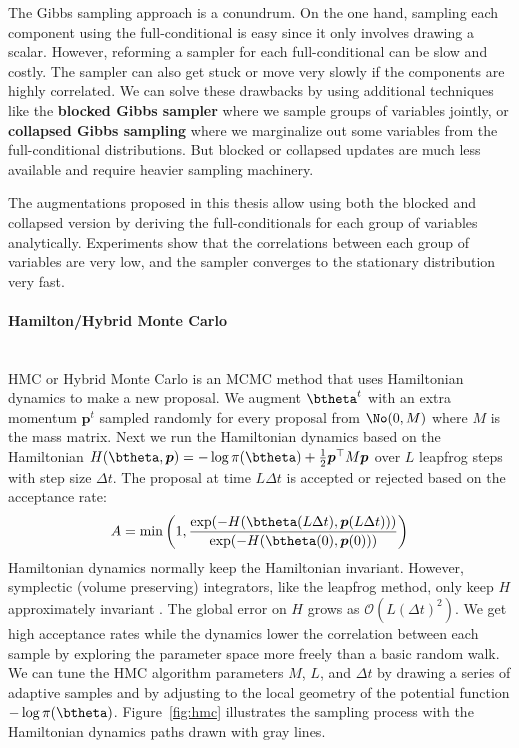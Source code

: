 The Gibbs sampling approach is a conundrum.
On the one hand, sampling each component using the full-conditional is easy since it only involves drawing a scalar.
However, reforming a sampler for each full-conditional can be slow and costly.
The sampler can also get stuck or move very slowly if the components are highly correlated.
We can solve these drawbacks by using additional techniques like the \textbf{blocked Gibbs sampler} \cite{jensen1995blocking} where we sample groups of variables jointly, or \textbf{collapsed Gibbs sampling} \cite{liu1994collapsed} where we marginalize out some variables from the full-conditional distributions.
But blocked or collapsed updates are much less available and require heavier sampling machinery.

The augmentations proposed in this thesis allow using both the blocked and collapsed version by deriving the full-conditionals for each group of variables analytically.
Experiments show that the correlations between each group of variables are very low, and the sampler converges to the stationary distribution very fast.


\paragraph{Hamilton/Hybrid Monte Carlo}\mbox{}\\
\label{sec:hmc}
\acf{HMC} or Hybrid Monte Carlo \cite{duane1987hybrid, neal2011mcmc, betancourt2017conceptual} is an \ac{MCMC} method that uses Hamiltonian dynamics to make a new proposal.
We augment $\btheta^t$ with an extra momentum $\boldsymbol{p}^t$ sampled randomly for every proposal from $\No(0,M)$ where $M$ is the mass matrix.
Next we run the Hamiltonian dynamics based on the Hamiltonian $H(\btheta, \boldsymbol{p}) = -\log \pi(\btheta) + \frac{1}{2}\boldsymbol{p}^\top M \boldsymbol{p}$ over $L$ leapfrog steps with step size $\Delta t$.
The proposal at time $L\Delta t$ is accepted or rejected based on the acceptance rate:
\begin{align*}
    A = \min\left(1, \frac{\exp(-H(\btheta(L\Delta t), \boldsymbol{p}(L\Delta t)))}{\exp(-H(\btheta(0), \boldsymbol{p}(0)))}\right)
\end{align*}
Hamiltonian dynamics normally keep the Hamiltonian invariant.
However, symplectic (volume preserving) integrators, like the leapfrog method, only keep $H$ approximately invariant \cite{neal2011mcmc}.
The global error on $H$ grows as $\mathcal{O}(L(\Delta t)^2)$.
We get high acceptance rates while the dynamics lower the correlation between each sample by exploring the parameter space more freely than a basic random walk.
We can tune the \ac{HMC} algorithm parameters $M$, $L$, and $\Delta t$ by drawing a series of adaptive samples and by adjusting to the local geometry of the potential function $-\log\pi(\btheta)$.
Figure~\ref{fig:hmc} illustrates the sampling process with the Hamiltonian dynamics paths drawn with gray lines.

